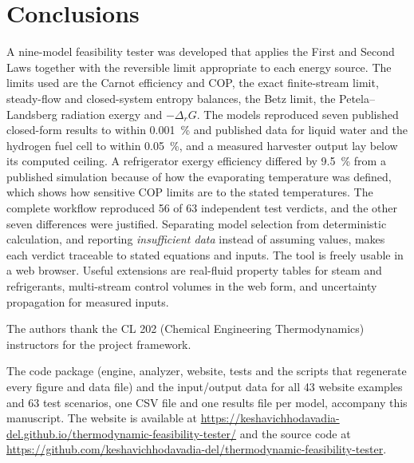 \documentclass[journal=iecred,manuscript=article,layout=twocolumn,email=false]{achemso}
\begin{document}
\section{Conclusions}
A nine-model feasibility tester was developed that applies the First and Second Laws together with the reversible
limit appropriate to each energy source. The limits used are the Carnot efficiency and COP, the exact finite-stream
limit, steady-flow and closed-system entropy balances, the Betz limit, the Petela--Landsberg radiation exergy and
$-\Delta_rG$. The models reproduced seven published closed-form results to within \SI{0.001}{\percent} and
published data for liquid water and the hydrogen fuel cell to within \SI{0.05}{\percent}, and a measured harvester
output lay below its computed ceiling. A refrigerator exergy efficiency differed by \SI{9.5}{\percent} from a
published simulation because of how the evaporating temperature was defined, which shows how sensitive COP limits are
to the stated temperatures. The complete
workflow reproduced 56 of 63 independent test verdicts, and the other seven differences were justified. Separating
model selection from deterministic calculation, and reporting \emph{insufficient data} instead of assuming values,
makes each verdict traceable to stated equations and inputs. The tool is freely usable in a web browser.
Useful extensions are real-fluid property tables for steam and refrigerants, multi-stream control volumes in the web
form, and uncertainty propagation for measured inputs.

\begin{acknowledgement}
The authors thank the CL 202 (Chemical Engineering Thermodynamics) instructors for the project framework.
\end{acknowledgement}

\begin{suppinfo}
The code package (engine, analyzer, website, tests and the scripts that regenerate every figure and data file) and the
input/output data for all 43 website examples and 63 test scenarios, one CSV file and one results file per model,
accompany this manuscript. The website is available at
\url{https://keshavichhodavadia-del.github.io/thermodynamic-feasibility-tester/} and the source code at
\url{https://github.com/keshavichhodavadia-del/thermodynamic-feasibility-tester}.
\end{suppinfo}


\end{document}

